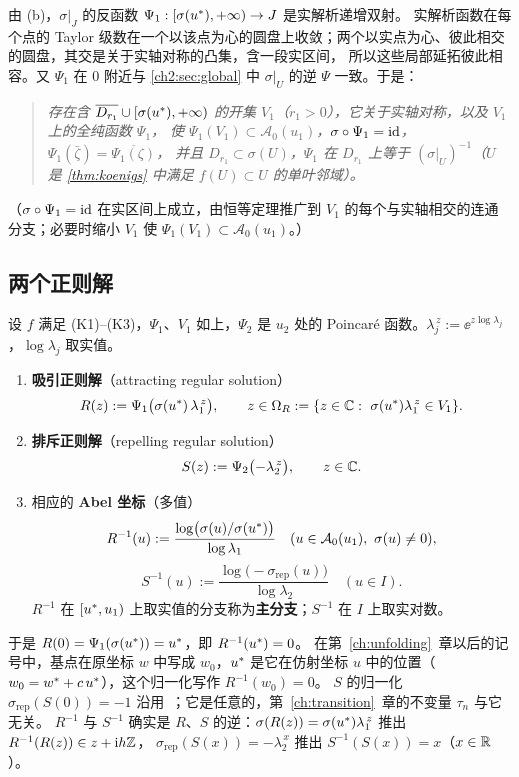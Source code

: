 由 (b)，$\sigma|_J$ 的反函数 $\Psi_1:[\sigma(u^{*}),+\infty)\to J$ 是实解析递增双射。
实解析函数在每个点的 Taylor 级数在一个以该点为心的圆盘上收敛；两个以实点为心、彼此相交的圆盘，其交是关于实轴对称的凸集，含一段实区间，
所以这些局部延拓彼此相容。又 $\Psi_1$ 在 $0$ 附近与 \cref{ch2:sec:global} 中 $\sigma|_U$ 的逆 $\Psi$ 一致。于是：

\begin{quote}
\emph{存在含 $\overline{D_{r_1}}\cup[\sigma(u^{*}),+\infty)$ 的开集 $V_1$（$r_1>0$），它关于实轴对称，以及 $V_1$ 上的全纯函数 $\Psi_1$，
使 $\Psi_1(V_1)\subset\mathcal A_0(u_1)$，$\sigma\circ\Psi_1=\mathrm{id}$，$\Psi_1(\bar\zeta)=\overline{\Psi_1(\zeta)}$，
并且 $D_{r_1}\subset\sigma(U)$，$\Psi_1$ 在 $D_{r_1}$ 上等于 $(\sigma|_U)^{-1}$（$U$ 是 \cref{thm:koenigs} 中满足 $f(U)\subset U$ 的单叶邻域）。}
\end{quote}
（$\sigma\circ\Psi_1=\mathrm{id}$ 在实区间上成立，由恒等定理推广到 $V_1$ 的每个与实轴相交的连通分支；必要时缩小 $V_1$ 使 $\Psi_1(V_1)\subset\mathcal A_0(u_1)$。）

\subsection{两个正则解}

\begin{definition}[正则解]\label{def:regular-solution}
设 $f$ 满足 \textup{(K1)--(K3)}，$\Psi_1$、$V_1$ 如上，$\Psi_2$ 是 $u_2$ 处的 Poincaré 函数。$\lambda_j^{\,z}:=\ee^{z\log\lambda_j}$，$\log\lambda_j$ 取实值。
\begin{enumerate}[label=(\alph*)]
\item \textbf{吸引正则解}（attracting regular solution）
  \[
    R(z):=\Psi_1\bigl(\sigma(u^{*})\,\lambda_1^{\,z}\bigr),\qquad z\in\Omega_R:=\{z\in\mathbb{C}:\ \sigma(u^{*})\lambda_1^{\,z}\in V_1\}.
  \]
\item \textbf{排斥正则解}（repelling regular solution）
  \[
    S(z):=\Psi_2\bigl(-\lambda_2^{\,z}\bigr),\qquad z\in\mathbb{C} .
  \]
\item 相应的 \textbf{Abel 坐标}（多值）
  \[
    R^{-1}(u):=\frac{\log\bigl(\sigma(u)/\sigma(\ustar)\bigr)}{\log\lambda_1}\quad(u\in\mathcal A_0(u_1),\ \sigma(u)\ne0),\]\[
    S^{-1}(u):=\frac{\log\bigl(-\sigma_{\mathrm{rep}}(u)\bigr)}{\log\lambda_2}\quad(u\in I).
  \]
  $R^{-1}$ 在 $[u^{*},u_1)$ 上取实值的分支称为\textbf{主分支}；$S^{-1}$ 在 $I$ 上取实对数。
\end{enumerate}
\end{definition}

于是 $R(0)=\Psi_1(\sigma(u^{*}))=u^{*}$，即 $R^{-1}(u^{*})=0$。
在第~\ref{ch:unfolding}~章以后的记号中，基点在原坐标 $w$ 中写成 $w_0$，$u^{*}$ 是它在仿射坐标 $u$ 中的位置（$w_0=w^*+c\,u^{*}$），这个归一化写作 $R^{-1}(w_0)=0$。
$S$ 的归一化 $\sigma_{\mathrm{rep}}(S(0))=-1$ 沿用~\cite[\S3.1]{KneserPaper}；它是任意的，第~\ref{ch:transition}~章的不变量 $\tau_n$ 与它无关。
$R^{-1}$ 与 $S^{-1}$ 确实是 $R$、$S$ 的逆：$\sigma(R(z))=\sigma(u^{*})\lambda_1^{\,z}$ 推出 $R^{-1}(R(z))\in z+\mathrm{i} h\mathbb{Z}$，
$\sigma_{\mathrm{rep}}(S(x))=-\lambda_2^{\,x}$ 推出 $S^{-1}(S(x))=x$（$x\in\mathbb{R}$）。


